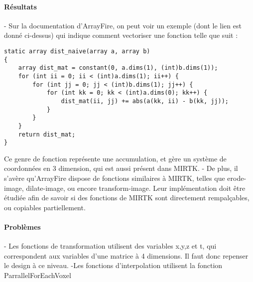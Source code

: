 \documentclass{report}
\begin{document}
\paragraph{Résultats}
 - Sur la documentation d'ArrayFire, on peut voir un exemple (dont le lien est donné ci-dessus) qui indique comment vectoriser une fonction telle que suit : \begin{lstlisting} 
static array dist_naive(array a, array b)
{
	array dist_mat = constant(0, a.dims(1), (int)b.dims(1));
	for (int ii = 0; ii < (int)a.dims(1); ii++) {
		for (int jj = 0; jj < (int)b.dims(1); jj++) {
			for (int kk = 0; kk < (int)a.dims(0); kk++) {
				dist_mat(ii, jj) += abs(a(kk, ii) - b(kk, jj));
			}
		}
	}
	return dist_mat;
}
\end{lstlisting} 
Ce genre de fonction représente une accumulation, et gère un système de coordonnées en 3 dimension, qui est aussi présent dans MIRTK.\newline
- De plus, il s'avère qu'ArrayFire dispose de fonctions similaires à MIRTK, telles que erode-image, dilate-image, ou encore transform-image. Leur implémentation doit être étudiée afin de savoir si des fonctions de MIRTK sont directement rempalçables, ou copiables partiellement.
\paragraph{Problèmes}

- Les fonctions de transformation utilisent des variables x,y,z et t, qui correspondent aux variables d'une matrice à 4 dimensions. Il faut donc repenser le design à ce niveau.
\newline
-Les fonctions d'interpolation utilisent la fonction ParrallelForEachVoxel
\end{document}
